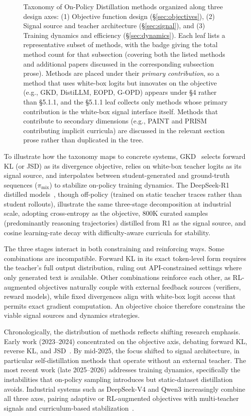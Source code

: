\documentclass{article} %
\begin{document}
\begin{figure}[!htbp]
\caption{Taxonomy of On-Policy Distillation methods organized along three design axes: (1) Objective function design (\S\ref{sec:objectives}), (2) Signal source and teacher architecture (\S\ref{sec:signal}), and (3) Training dynamics and efficiency (\S\ref{sec:dynamics}). Each leaf lists a representative subset of methods, with the badge giving the total method count for that subsection (covering both the listed methods and additional papers discussed in the corresponding subsection prose). Methods are placed under their \emph{primary contribution}, so a method that uses white-box logits but innovates on the objective (e.g., GKD, DistiLLM, EOPD, G-OPD) appears under \S 4 rather than \S 5.1.1, and the \S 5.1.1 leaf collects only methods whose primary contribution is the white-box signal interface itself. Methods that contribute to secondary dimensions (e.g., PAINT and PRISM contributing implicit curricula) are discussed in the relevant section prose rather than duplicated in the tree.}
\label{fig:taxonomy}
\end{figure}

To illustrate how the taxonomy maps to concrete systems, GKD~\citep{2306.13649} selects forward KL (or JSD) as its divergence objective, relies on white-box teacher logits as its signal source, and interpolates between student-generated and ground-truth sequences ($\pi_{\mathrm{mix}}$) to stabilize on-policy training dynamics. The DeepSeek-R1 distilled models~\citep{2501.12948}, though off-policy (trained on static teacher traces rather than student rollouts), illustrate the same three-stage decomposition at industrial scale, adopting cross-entropy as the objective, 800K curated samples (predominantly reasoning trajectories) distilled from R1 as the signal source, and cosine learning-rate decay with difficulty-aware curricula for stability.

The three stages interact in both constraining and reinforcing ways. Some combinations are incompatible. Forward KL in its exact token-level form requires the teacher's full output distribution, ruling out API-constrained settings where only generated text is available. Other combinations reinforce each other, as RL-augmented objectives naturally couple with external feedback sources (verifiers, reward models), while fixed divergences align with white-box logit access that permits exact gradient computation. An objective choice therefore constrains the viable signal sources and dynamics strategies.

Chronologically, the distribution of methods reflects shifting research emphasis. Early work (2023--2024) concentrated on the objective axis, debating forward KL, reverse KL, and JSD~\citep{2306.13649,2306.08543}. By mid-2025, the focus shifted to signal architecture, in particular self-distillation methods that operate without an external teacher. The most recent work (late 2025--2026) addresses training dynamics, specifically the instabilities that on-policy sampling introduces but static-dataset distillation avoids. Industrial systems such as DeepSeek-V4 and Qwen3 increasingly combine all three axes, pairing adaptive or RL-augmented objectives with multi-teacher signals and curriculum-based stabilization~\citep{2602.12125,2505.09388}.
\end{document}
